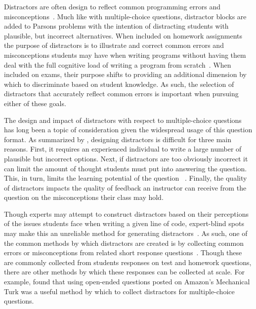 \documentclass[authorversion,nonacm]{acmart}
\begin{document}
Distractors are often design to reflect common programming errors and
misconceptions~\cite{du2020review, parsons2006parson}.  Much like with
multiple-choice questions, distractor blocks are added to Parsons problems with
the intention of distracting students with plausible, but incorrect
alternatives.  When included on homework assignments the purpose of distractors
is to illustrate and correct common errors and misconceptions students may have
when writing programs without having them deal with the full cognitive load of
writing a program from scratch~\cite{ericson2017solving, haynes2021problem}.
When included on exams, their purpose shifts to providing an additional
dimension by which to discriminate based on student knowledge. As such, the
selection of distractors that accurately reflect common errors is important
when pursuing either of these goals. 

The design and impact of distractors with respect to multiple-choice questions
has long been a topic of consideration given the widespread usage of this
question format.  As summarized by \citet{gierl2017developing}, designing
distractors is difficult for three main reasons. First, it requires an
experienced individual to write a large number of plausible but incorrect
options.  Next, if distractors are too obviously incorrect it can limit the
amount of thought students must put into answering the question. This, in turn,
limits the learning potential of the question ~\cite{little2015optimizing}.
Finally, the quality of distractors impacts the quality of feedback an
instructor can receive from the question on the misconceptions their class may
hold.

Though experts may attempt to construct distractors based on their perceptions
of the issues students face when writing a given line of code, expert-blind
spots may make this an unreliable method for generating
distractors~\cite{nathan2001expert}. As such, one of the common methods by
which distractors are created is by collecting common errors or misconceptions
from related short response questions~\cite{briggs2006diagnostic,
halloun1985initial}. Though these are commonly collected from students
responses on test and homework questions, there are other methods by which
these responses can be collected at scale.  For example,
\citet{scheponik2019investigating} found that using open-ended questions posted
on Amazon's Mechanical Turk was a useful method by which to collect distractors
for multiple-choice questions. 
\end{document}
